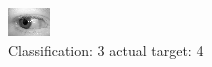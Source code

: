 \begin{figure}[h!]
\begin{center}
\includegraphics[width=0.60\columnwidth]{figures/ID719_class_3_target_4.png}
\end{center}
\caption{ Classification: 3 actual target: 4}
\label{fig:ID719_class_3_target_4}
\end{figure}
